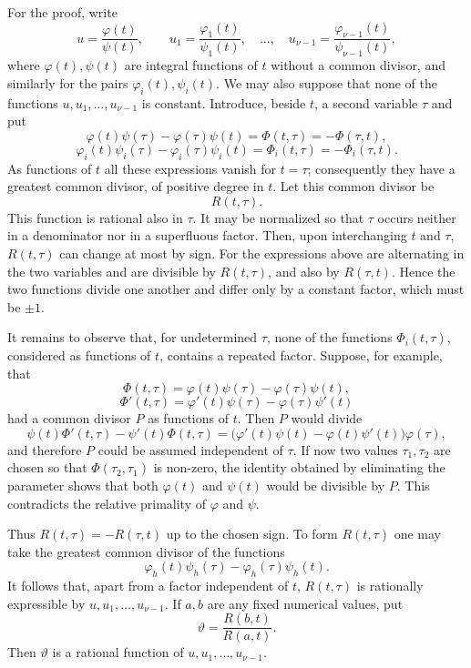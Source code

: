 \documentclass[12pt,a4paper]{article}
\begin{document}
For the proof, write
\begin{equation}
 u=\frac{\varphi(t)}{\psi(t)},\qquad
 u_1=\frac{\varphi_1(t)}{\psi_1(t)},\quad\ldots,\quad
 u_{\nu-1}=\frac{\varphi_{\nu-1}(t)}{\psi_{\nu-1}(t)},
\end{equation}
where $\varphi(t),\psi(t)$ are integral functions of $t$ without a common divisor, and similarly for the pairs $\varphi_i(t),\psi_i(t)$.  We may also suppose that none of the functions $u,u_1,\ldots,u_{\nu-1}$ is constant.  Introduce, beside $t$, a second variable $\tau$ and put
\[
 \varphi(t)\psi(\tau)-\varphi(\tau)\psi(t)=\Phi(t,\tau)=-\Phi(\tau,t),
\]
\[
 \varphi_i(t)\psi_i(\tau)-\varphi_i(\tau)\psi_i(t)=\Phi_i(t,\tau)=-\Phi_i(\tau,t).
\]
As functions of $t$ all these expressions vanish for $t=\tau$; consequently they have a greatest common divisor, of positive degree in $t$.  Let this common divisor be
\begin{equation}
 R(t,\tau).
\end{equation}
This function is rational also in $\tau$.  It may be normalized so that $\tau$ occurs neither in a denominator nor in a superfluous factor.  Then, upon interchanging $t$ and $\tau$, $R(t,\tau)$ can change at most by sign.  For the expressions above are alternating in the two variables and are divisible by $R(t,\tau)$, and also by $R(\tau,t)$.  Hence the two functions divide one another and differ only by a constant factor, which must be $\pm1$.

It remains to observe that, for undetermined $\tau$, none of the functions $\Phi_i(t,\tau)$, considered as functions of $t$, contains a repeated factor.  Suppose, for example, that
\[
 \Phi(t,\tau)=\varphi(t)\psi(\tau)-\varphi(\tau)\psi(t),
\]
\[
 \Phi'(t,\tau)=\varphi'(t)\psi(\tau)-\varphi(\tau)\psi'(t)
\]
had a common divisor $P$ as functions of $t$.  Then $P$ would divide
\[
 \psi(t)\Phi'(t,\tau)-\psi'(t)\Phi(t,\tau)
  =\bigl(\varphi'(t)\psi(t)-\varphi(t)\psi'(t)\bigr)\varphi(\tau),
\]
and therefore $P$ could be assumed independent of $\tau$.  If now two values $\tau_1,\tau_2$ are chosen so that $\Phi(\tau_2,\tau_1)$ is non-zero, the identity obtained by eliminating the parameter shows that both $\varphi(t)$ and $\psi(t)$ would be divisible by $P$.  This contradicts the relative primality of $\varphi$ and $\psi$.

Thus $R(t,\tau)=-R(\tau,t)$ up to the chosen sign.  To form $R(t,\tau)$ one may take the greatest common divisor of the functions
\[
 \varphi_h(t)\psi_h(\tau)-\varphi_h(\tau)\psi_h(t).
\]
It follows that, apart from a factor independent of $t$, $R(t,\tau)$ is rationally expressible by $u,u_1,\ldots,u_{\nu-1}$.  If $a,b$ are any fixed numerical values, put
\begin{equation}
 \vartheta=\frac{R(b,t)}{R(a,t)}.
\end{equation}
Then $\vartheta$ is a rational function of $u,u_1,\ldots,u_{\nu-1}$.
\end{document}
